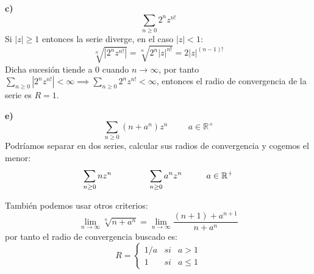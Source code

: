 \begin{sol}


\textbf{c)}
$$\sum_{n\geq 0} 2^nz^{n!}$$
Si $|z|\geq 1$ entonces la serie diverge, en el caso $|z|<1$:
$$\sqrt[n]{|2^nz^{n!}|} = \sqrt[n]{2^n|z|^{n!}} = 2|z|^{(n-1)!}$$
Dicha sucesión tiende a $0$ cuando $n\rightarrow\infty$, por tanto %
$\sum_{n\geq 0} |2^nz^{n!}| < \infty \implies \sum_{n\geq 0} 2^nz^{n!} < \infty$, entonces el radio de convergencia de la serie es $R=1$.



\textbf{e)}
$$\sum_{n\geq 0} (n+a^n)z^n \hspace{1cm} a\in\mathbb{R}^+$$
Podríamos separar en dos series, calcular sus radios de convergencia y cogemos el menor:
$$\sum_{n\geq 0} nz^n \hspace{1.5cm}\sum_{n\geq 0} a^nz^n\hspace{1cm} a\in\mathbb{R}^+$$
\begin{comment}
Observamos que $a^n \leq n+a^n \leq (n+1)a^n$,
en los extremos el radio de convergencia es $1/a$, por tanto el radio de convergencia de $n+a^n$ es $1/a$
$$\sum_{n\geq 0} a^n |z|^n \leq \sum_{n\geq 0} (n+a^n)|z|^n \leq \sum_{n\geq 0} (n+1)a^n|z|^n$$
Por tanto el radio de convergencia es $1/a$.
\end{comment}

También podemos usar otros criterios:
$$\lim_{n\rightarrow\infty} \sqrt[n]{n+a^n} = \lim_{n\rightarrow\infty} \frac{(n+1)+a^{n+1}}{n+a^n} $$
por tanto el radio de convergencia buscado es:
$$ R = \left\{ \begin{array}{lcc}
1/a &   si  & a>1 \\
1 &  si & a\leq 1
\end{array}
\right. $$


\begin{comment}
\textbf{f)}
$\sum_{n\geq 0} a^{n^2}z^n,a\in\mathbb{C}$
raíz n-esima 
\end{comment}

\end{sol}

